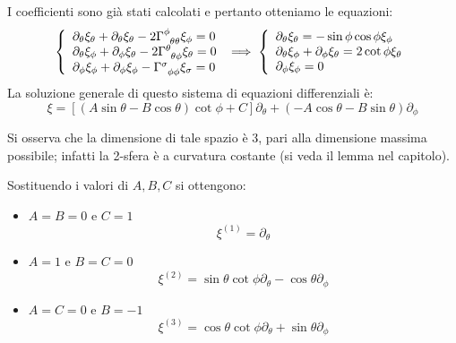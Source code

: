 I coefficienti sono già stati calcolati e pertanto otteniamo le equazioni:
\begin{equation*}
   \left\{ \begin{array}{l}
        \partial_\theta \xi_\theta + \partial_\theta \xi_\theta - 2 \tensor{\Gamma}{^\phi_{\theta\theta}}\xi_\phi = 0 \\
        \partial_\theta \xi_\phi + \partial_\phi \xi_\theta - 2 \tensor{\Gamma}{^\theta_{\theta\phi}}\xi_\theta = 0 \\
        \partial_\phi \xi_\phi + \partial_\phi \xi_\phi - \tensor{\Gamma}{^\sigma_{\phi\phi}}\xi_\sigma = 0
    \end{array}\right.
    \implies
    \left\{ \begin{array}{l}
        \partial_\theta \xi_\theta = - \sin\phi\cos\phi \xi_\phi \\
        \partial_\theta \xi_\phi + \partial_\phi \xi_\theta = 2\cot \phi \xi_\theta \\
        \partial_\phi \xi_\phi = 0
    \end{array}\right.
\end{equation*}
La soluzione generale di questo sistema di equazioni differenziali è:
\begin{equation*}
    \xi = [ (A\sin\theta -B \cos\theta)\cot\phi + C]\partial_\theta + ( -A\cos \theta - B\sin\theta)\partial_\phi
\end{equation*}

Si osserva che la dimensione di tale spazio è 3, pari alla dimensione massima possibile; infatti la 2-sfera è a curvatura costante (si veda il lemma nel capitolo).

Sostituendo i valori di $A, B, C$ si ottengono:
\begin{itemize}
    \item $A=B= 0$ e $C= 1$ \begin{equation*}
        \xi^{(1)} = \partial_\theta
    \end{equation*}
    \item $A=1$ e $B=C=0$ \begin{equation*}
        \xi^{(2)} = \sin\theta\cot\phi \partial_\theta - \cos\theta\partial_\phi
    \end{equation*}
    \item $A=C=0$ e $B=-1$ \begin{equation*}
        \xi^{(3)} = \cos \theta\cot\phi \partial_\theta + \sin\theta \partial_\phi
    \end{equation*}
\end{itemize}

